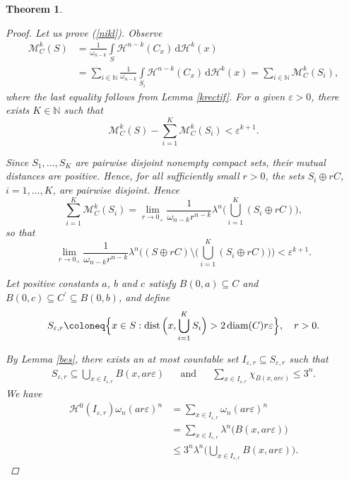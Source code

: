 \documentclass[pdflatex,sn-mathphys-num]{sn-jnl}
\theoremstyle{plain}
\newtheorem{theorem}{Theorem}[section]
\theoremstyle{definition}
\DeclareMathOperator{\dist}{\textup{dist}}
\DeclareMathOperator{\diam}{\textup{diam}}
\newcommand{\dH}[1]{\,\mathrm d\mathcal{H}^{#1}}
\begin{document}
\begin{theorem}
\begin{proof}
Let us prove (\ref{nikl}). Observe
\begin{equation*}
\begin{split}
\mathcal{M}^k_C(S)&=\frac{1}{\omega_{n-k}}\int\limits_{S}\mathcal{H}^{n-k}(C_x)\dH{k}(x)\\
&=\sum_{i\in\mathbb{N}}\frac{1}{\omega_{n-k}}\int\limits_{S_i}\mathcal{H}^{n-k}(C_x)\dH{k}(x)=\sum_{i\in\mathbb{N}}\mathcal{M}^k_C(S_i),
\end{split}
\end{equation*}
where the last equality follows from Lemma \ref{krectif}. For a given $\varepsilon>0$, there exists $K\in\mathbb{N}$ such that
\[
\mathcal{M}^k_C(S)-\sum_{i=1}^K\mathcal{M}^k_C(S_i)<\varepsilon^{k+1}.
\]

Since $S_1, \dots, S_K$ are pairwise disjoint nonempty compact sets, their mutual
distances are positive. Hence, for all sufficiently small $r>0$, the sets
$S_i\oplus rC$, $i=1, \dots, K$, are pairwise disjoint. Hence
\begin{equation*}
\sum_{i=1}^K\mathcal{M}_C^k(S_i)=\lim_{r\to0_+}\frac{1}{\omega_{n-k}r^{n-k}}\lambda^n\Big(\bigcup_{i=1}^K (S_i\oplus rC)\Big),
\end{equation*}
so that
\begin{equation}\label{rum}
\lim_{r\to0_+}\frac{1}{\omega_{n-k}r^{n-k}}\lambda^n\bigg((S\oplus rC)\setminus\Big(\bigcup_{i=1}^K (S_i\oplus rC)\Big)\bigg)<\varepsilon^{k+1}.
\end{equation}

Let positive constants $a$, $b$ and $c$ satisfy $B(0,a)\subseteq C$ and $B(0, c)\subseteq C^{\prime}\subseteq B(0,b)$, and define
\[
S_{\varepsilon, r}\coloneq \Big\{x\in S : \dist\Big(x, \bigcup_{i=1}^K S_i\Big)>2\diam(C)r\varepsilon \Big\}, \quad r>0.
\]

By Lemma \ref{bes}, there exists an at most countable set $I_{\varepsilon, r}\subseteq S_{\varepsilon, r}$ such that
\begin{align}\label{pp12}
    S_{\varepsilon, r}\subseteq \bigcup_{x\in I_{\varepsilon, r}} B(x, ar\varepsilon)&&\text{and}&&\sum_{x\in I_{\varepsilon, r}}\chi_{B(x, ar\varepsilon)}\leq 3^n.
\end{align}
We have \begin{equation*}
    \begin{split}
        \mathcal{H}^0(I_{\varepsilon, r})\omega_n (ar\varepsilon)^n&=\sum_{x\in I_{\varepsilon, r}}\omega_n (ar\varepsilon)^n\\&=\sum_{x\in I_{\varepsilon, r}}\lambda^n\big(B(x, ar\varepsilon)\big)\\&\leq 3^n\lambda^n\Big(\bigcup_{x\in I_{\varepsilon, r}}B(x, ar\varepsilon)\Big).
    \end{split}
\end{equation*}


\end{proof}
\end{theorem}
\end{document}
